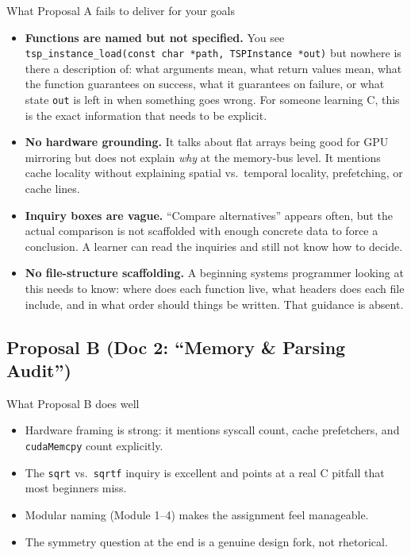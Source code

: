 \documentclass[11pt]{article}
\begin{document}
\begin{critique}{What Proposal A fails to deliver for your goals}
\begin{itemize}
  \item \textbf{Functions are named but not specified.} You see \texttt{tsp\_instance\_load(const char *path, TSPInstance *out)} but nowhere is there a description of: what arguments mean, what return values mean, what the function guarantees on success, what it guarantees on failure, or what state \texttt{out} is left in when something goes wrong. For someone learning C, this is the exact information that needs to be explicit.
  \item \textbf{No hardware grounding.} It talks about flat arrays being good for GPU mirroring but does not explain \emph{why} at the memory-bus level. It mentions cache locality without explaining spatial vs.\ temporal locality, prefetching, or cache lines.
  \item \textbf{Inquiry boxes are vague.} ``Compare alternatives'' appears often, but the actual comparison is not scaffolded with enough concrete data to force a conclusion. A learner can read the inquiries and still not know how to decide.
  \item \textbf{No file-structure scaffolding.} A beginning systems programmer looking at this needs to know: where does each function live, what headers does each file include, and in what order should things be written. That guidance is absent.
\end{itemize}
\end{critique}

\subsection{Proposal B (Doc 2: ``Memory \& Parsing Audit'')}

\begin{goodbox}{What Proposal B does well}
\begin{itemize}
  \item Hardware framing is strong: it mentions syscall count, cache prefetchers, and \texttt{cudaMemcpy} count explicitly.
  \item The \texttt{sqrt} vs.\ \texttt{sqrtf} inquiry is excellent and points at a real C pitfall that most beginners miss.
  \item Modular naming (Module 1--4) makes the assignment feel manageable.
  \item The symmetry question at the end is a genuine design fork, not rhetorical.
\end{itemize}
\end{goodbox}
\end{document}

